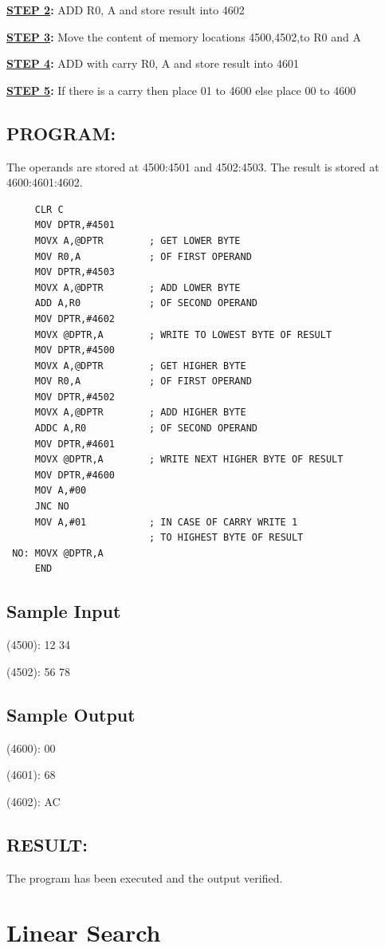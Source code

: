 \documentclass[a4paper,28pt]{report}
\begin{document}
\textbf{\underline{STEP 2}:} ADD R0, A and store result into 4602 

\textbf{\underline{STEP 3}:} Move the content of memory locations 4500,4502,to R0 and A

\textbf{\underline{STEP 4}:} ADD with carry R0, A and store result into 4601

\textbf{\underline{STEP 5}:} If there is a carry then place 01 to 4600 else place 00 to 4600
\section*{PROGRAM:}
The operands are stored at 4500:4501 and 4502:4503. The result is stored at 4600:4601:4602.
\begin{lstlisting}
     CLR C
     MOV DPTR,#4501
     MOVX A,@DPTR        ; GET LOWER BYTE
     MOV R0,A            ; OF FIRST OPERAND
     MOV DPTR,#4503
     MOVX A,@DPTR        ; ADD LOWER BYTE
     ADD A,R0            ; OF SECOND OPERAND
     MOV DPTR,#4602
     MOVX @DPTR,A        ; WRITE TO LOWEST BYTE OF RESULT
     MOV DPTR,#4500
     MOVX A,@DPTR        ; GET HIGHER BYTE
     MOV R0,A            ; OF FIRST OPERAND
     MOV DPTR,#4502      
     MOVX A,@DPTR        ; ADD HIGHER BYTE
     ADDC A,R0           ; OF SECOND OPERAND
     MOV DPTR,#4601
     MOVX @DPTR,A        ; WRITE NEXT HIGHER BYTE OF RESULT
     MOV DPTR,#4600
     MOV A,#00
     JNC NO
     MOV A,#01           ; IN CASE OF CARRY WRITE 1
                         ; TO HIGHEST BYTE OF RESULT
 NO: MOVX @DPTR,A 
     END
\end{lstlisting}
\section*{Sample Input}
(4500): 12 34

(4502): 56 78
\section*{Sample Output}
(4600): 00

(4601): 68

(4602): AC
\section*{RESULT:}
The program has been executed and the output verified.
%
%
\chapter{Linear Search}
\end{document}
